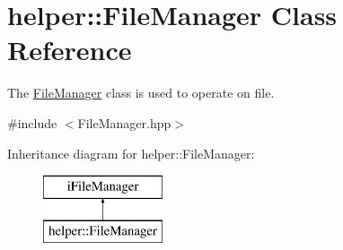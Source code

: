 \hypertarget{classhelper_1_1_file_manager}{}\section{helper\+::File\+Manager Class Reference}
\label{classhelper_1_1_file_manager}


The \mbox{\hyperlink{classhelper_1_1_file_manager}{File\+Manager}} class is used to operate on file.  




{\ttfamily \#include $<$File\+Manager.\+hpp$>$}

Inheritance diagram for helper\+::File\+Manager\+:\begin{figure}[H]
\begin{center}
\leavevmode
\includegraphics[height=2.000000cm]{classhelper_1_1_file_manager}
\end{center}
\end{figure}
